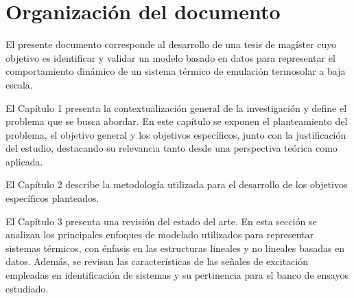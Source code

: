 \documentclass[11pt]{report}
\begin{document}

\section{Organización del documento}
El presente documento corresponde al desarrollo de una tesis de magíster cuyo objetivo es identificar y validar un modelo basado en datos para representar el comportamiento dinámico de un sistema térmico de emulación termosolar a baja escala.

El Capítulo 1 presenta la contextualización general de la investigación y define el problema que se busca abordar. En este capítulo se exponen el planteamiento del problema, el objetivo general y los objetivos específicos, junto con la justificación del estudio, destacando su relevancia tanto desde una perspectiva teórica como aplicada.

El Capítulo 2 describe  la metodología utilizada para el desarrollo de los objetivos específicos planteados. 

El Capítulo 3 presenta una revisión del estado del arte. En esta sección se analizan los principales enfoques de modelado utilizados para representar sistemas térmicos, con énfasis en las estructuras lineales y no lineales basadas en datos. Además, se revisan las características de las señales de excitación empleadas en identificación de sistemas y su pertinencia para el banco de ensayos estudiado.
\end{document}

